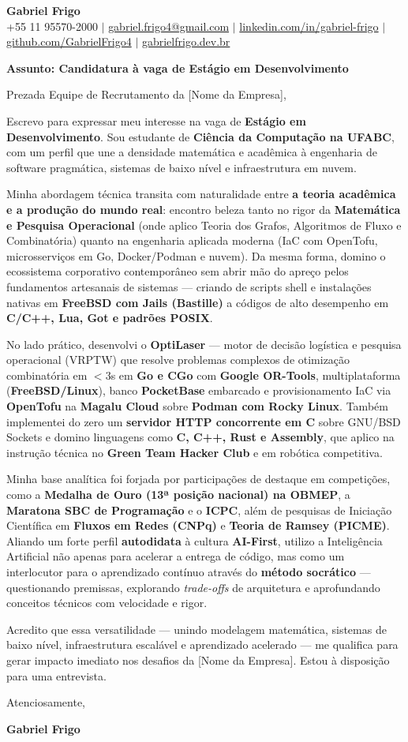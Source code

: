 \documentclass[letterpaper,10pt]{article}
\newcommand{\targetRole}{Estágio em Desenvolvimento}
\newcommand{\targetCompany}{[Nome da Empresa]}
\begin{document}
\begin{center}
  \textbf{\Huge Gabriel Frigo} \\ \vspace{4pt}
  \small +55 11 95570-2000 $|$ \href{mailto:gabriel.frigo4@gmail.com}{gabriel.frigo4@gmail.com} $|$
  \href{https://linkedin.com/in/gabriel-frigo-b6727b275/}{linkedin.com/in/gabriel-frigo} $|$
  \href{https://github.com/GabrielFrigo4}{github.com/GabrielFrigo4} $|$
  \href{https://gabrielfrigo.dev.br}{gabrielfrigo.dev.br}
\end{center}

\vspace{6pt}

\textbf{Assunto: Candidatura à vaga de \targetRole}

Prezada Equipe de Recrutamento da \targetCompany,

Escrevo para expressar meu interesse na vaga de \textbf{\targetRole}. Sou estudante de \textbf{Ciência da Computação na UFABC}, com um perfil que une a densidade matemática e acadêmica à engenharia de software pragmática, sistemas de baixo nível e infraestrutura em nuvem.

Minha abordagem técnica transita com naturalidade entre \textbf{a teoria acadêmica e a produção do mundo real}: encontro beleza tanto no rigor da \textbf{Matemática e Pesquisa Operacional} (onde aplico Teoria dos Grafos, Algoritmos de Fluxo e Combinatória) quanto na engenharia aplicada moderna (IaC com OpenTofu, microsserviços em Go, Docker/Podman e nuvem). Da mesma forma, domino o ecossistema corporativo contemporâneo sem abrir mão do apreço pelos fundamentos artesanais de sistemas — criando de scripts shell e instalações nativas em \textbf{FreeBSD com Jails (Bastille)} a códigos de alto desempenho em \textbf{C/C++, Lua, Got e padrões POSIX}.

No lado prático, desenvolvi o \textbf{OptiLaser} — motor de decisão logística e pesquisa operacional (VRPTW) que resolve problemas complexos de otimização combinatória em $<3$s em \textbf{Go e CGo} com \textbf{Google OR-Tools}, multiplataforma (\textbf{FreeBSD/Linux}), banco \textbf{PocketBase} embarcado e provisionamento IaC via \textbf{OpenTofu} na \textbf{Magalu Cloud} sobre \textbf{Podman com Rocky Linux}. Também implementei do zero um \textbf{servidor HTTP concorrente em C} sobre GNU/BSD Sockets e domino linguagens como \textbf{C, C++, Rust e Assembly}, que aplico na instrução técnica no \textbf{Green Team Hacker Club} e em robótica competitiva.

Minha base analítica foi forjada por participações de destaque em competições, como a \textbf{Medalha de Ouro (13ª posição nacional) na OBMEP}, a \textbf{Maratona SBC de Programação} e o \textbf{ICPC}, além de pesquisas de Iniciação Científica em \textbf{Fluxos em Redes (CNPq)} e \textbf{Teoria de Ramsey (PICME)}. Aliando um forte perfil \textbf{autodidata} à cultura \textbf{AI-First}, utilizo a Inteligência Artificial não apenas para acelerar a entrega de código, mas como um interlocutor para o aprendizado contínuo através do \textbf{método socrático} — questionando premissas, explorando \textit{trade-offs} de arquitetura e aprofundando conceitos técnicos com velocidade e rigor.

Acredito que essa versatilidade — unindo modelagem matemática, sistemas de baixo nível, infraestrutura escalável e aprendizado acelerado — me qualifica para gerar impacto imediato nos desafios da \targetCompany. Estou à disposição para uma entrevista.

Atenciosamente,

\textbf{Gabriel Frigo}
\end{document}
